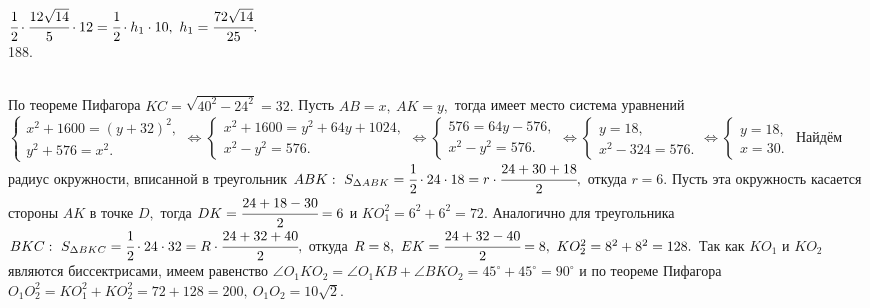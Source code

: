\documentclass[12pt]{article}
\begin{document}
$\cfrac{1}{2}\cdot\cfrac{12\sqrt{14}}{5}\cdot12=
\cfrac{1}{2}\cdot h_1\cdot10,\ h_1=\cfrac{72\sqrt{14}}{25}.$\\
188. \begin{figure}[ht!]
\end{figure}\\
По теореме Пифагора $KC=\sqrt{40^2-24^2}=32.$ Пусть $AB=x,\ AK=y,$ тогда имеет место система уравнений $\begin{cases}x^2+1600=(y+32)^2,\\
y^2+576=x^2.\end{cases}\Leftrightarrow\begin{cases}x^2+1600=y^2+64y+1024,\\
x^2-y^2=576.\end{cases}\Leftrightarrow\begin{cases}576=64y-576,\\
x^2-y^2=576.\end{cases}\Leftrightarrow\begin{cases}y=18,\\
x^2-324=576.\end{cases}\Leftrightarrow\begin{cases}y=18,\\
x=30.\end{cases}$ Найдём радиус окружности, вписанной в треугольник $ABK:\ S_{\Delta ABK}=\cfrac{1}{2}\cdot24\cdot18=r\cdot\cfrac{24+30+18}{2},$ откуда $r=6.$ Пусть эта окружность касается стороны $AK$ в точке $D,$ тогда $DK=\cfrac{24+18-30}{2}=6$ и $KO_1^2=6^2+6^2=72.$ Аналогично для треугольника $BKC:\ S_{\Delta BKC}=\cfrac{1}{2}\cdot24\cdot32=R\cdot\cfrac{24+32+40}{2},$ откуда $R=8,\ EK=\cfrac{24+32-40}{2}=8,\ KO_2^2=8^2+8^2=128.$ Так как $KO_1$ и $KO_2$ являются биссектрисами, имеем равенство $\angle O_1KO_2=\angle O_1KB+\angle BKO_2=45^\circ+45^\circ=90^\circ$ и по теореме Пифагора $O_1O_2^2=KO_1^2+KO_2^2=72+128=200,\ O_1O_2=10\sqrt{2}.$\\
\end{document}
